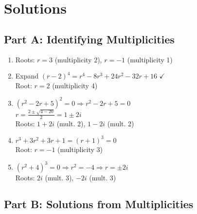 \documentclass[12pt]{article}
\begin{document}
\newpage

\section*{Solutions}

\subsection*{Part A: Identifying Multiplicities}

\begin{enumerate}
\item Roots: $r = 3$ (multiplicity 2), $r = -1$ (multiplicity 1)

\item Expand $(r-2)^{4} = r^{4} - 8r^{3} + 24r^{2} - 32r + 16$ $\checkmark$\\
Root: $r = 2$ (multiplicity 4)

\item $(r^{2} - 2r + 5)^{2} = 0 \Rightarrow r^{2} - 2r + 5 = 0$\\
$r = \frac{2 \pm \sqrt{4-20}}{2} = 1 \pm 2i$\\
Roots: $1 + 2i$ (mult. 2), $1 - 2i$ (mult. 2)

\item $r^{3} + 3r^{2} + 3r + 1 = (r+1)^{3} = 0$\\
Root: $r = -1$ (multiplicity 3)

\item $(r^{2} + 4)^{3} = 0 \Rightarrow r^{2} = -4 \Rightarrow r = \pm 2i$\\
Roots: $2i$ (mult. 3), $-2i$ (mult. 3)
\end{enumerate}

\subsection*{Part B: Solutions from Multiplicities}

\end{document}
